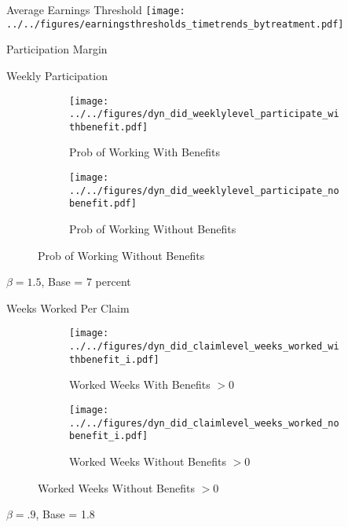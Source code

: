 \documentclass{beamer}
\begin{document}
\begin{frame}{Average Earnings Threshold}
\texttt{[image: ../../figures/earningsthresholds\_timetrends\_bytreatment.pdf]}
\end{frame}


\begin{frame}{Participation Margin}
\end{frame}


\begin{frame}{Weekly Participation}
	\begin{figure} \centering
		\begin{subfigure}{.49\textwidth}\centering\caption{\footnotesize Prob of Working With Benefits}\label{map1}
			\texttt{[image: ../../figures/dyn\_did\_weeklylevel\_participate\_withbenefit.pdf]}	
		\end{subfigure}
		\begin{subfigure}{.49\textwidth}\centering\caption{\footnotesize Prob of Working Without Benefits}\label{map2}
			\texttt{[image: ../../figures/dyn\_did\_weeklylevel\_participate\_nobenefit.pdf]}	
		\end{subfigure}
	\end{figure}
$\beta = 1.5$, Base = 7 percent
\end{frame}

\begin{frame}{Weeks Worked Per Claim}
	\begin{figure}\centering
		\begin{subfigure}{.49\textwidth}\centering\caption{\footnotesize Worked Weeks With Benefits $>0$}\label{map1}
		\texttt{[image: ../../figures/dyn\_did\_claimlevel\_weeks\_worked\_withbenefit\_i.pdf]}	
	\end{subfigure}
	\begin{subfigure}{.49\textwidth}\centering\caption{\footnotesize Worked Weeks Without Benefits $>0$ }\label{map2}
		\texttt{[image: ../../figures/dyn\_did\_claimlevel\_weeks\_worked\_nobenefit\_i.pdf]}
	\end{subfigure}
	\end{figure}
$\beta = .9$, Base = 1.8
\end{frame}
\end{document}
